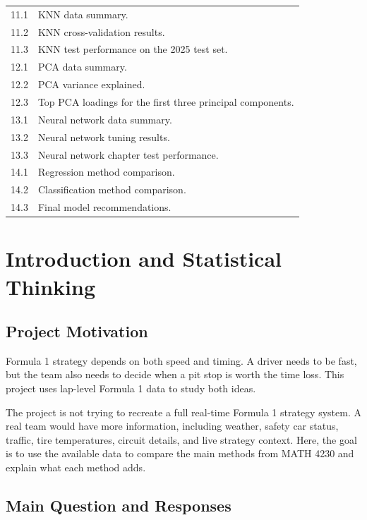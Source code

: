 \documentclass[11pt,oneside,openany]{book}
\begin{document}
\begin{longtable}{p{}p{}}
11.1 & KNN data summary.\\
11.2 & KNN cross-validation results.\\
11.3 & KNN test performance on the 2025 test set.\\
12.1 & PCA data summary.\\
12.2 & PCA variance explained.\\
12.3 & Top PCA loadings for the first three principal components.\\
13.1 & Neural network data summary.\\
13.2 & Neural network tuning results.\\
13.3 & Neural network chapter test performance.\\
14.1 & Regression method comparison.\\
14.2 & Classification method comparison.\\
14.3 & Final model recommendations.\\

\end{longtable}
\endgroup

\mainmatter


\chapter{Introduction and Statistical Thinking}

\section{Project Motivation}

Formula 1 strategy depends on both speed and timing. A driver needs to be fast, but the team also needs to decide when a pit stop is worth the time loss. This project uses lap-level Formula 1 data to study both ideas.

The project is not trying to recreate a full real-time Formula 1 strategy system. A real team would have more information, including weather, safety car status, traffic, tire temperatures, circuit details, and live strategy context. Here, the goal is to use the available data to compare the main methods from MATH 4230 and explain what each method adds.

\section{Main Question and Responses}
\end{document}
